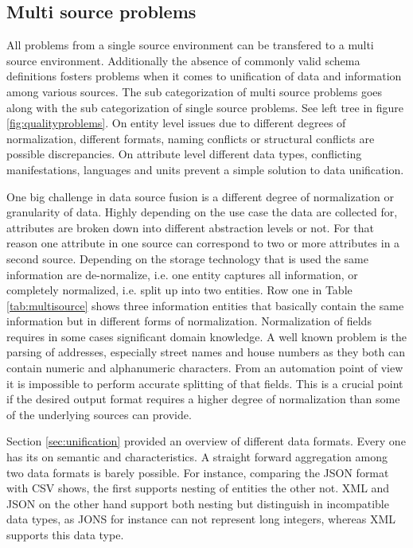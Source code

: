 \subsection{Multi source problems}
All problems from a single source environment can be transfered to a multi source environment. Additionally the absence of commonly valid schema definitions fosters problems when it comes to unification of data and information among various sources. The sub categorization of multi source problems goes along with the sub categorization of single source problems. See left tree in figure \ref{fig:qualityproblems}. On entity level issues due to different degrees of normalization, different formats, naming conflicts or structural conflicts are possible discrepancies. On attribute level different data types, conflicting manifestations, languages and units prevent a simple solution to data unification.

One big challenge in data source fusion is a different degree of normalization or granularity of data. Highly depending on the use case the data are collected for, attributes are broken down into different abstraction levels or not. For that reason one attribute in one source can correspond to two or more attributes in a second source. Depending on the storage technology that is used the same information are de-normalize, i.e. one entity captures all information, or completely normalized, i.e. split up into two entities. Row one in Table \ref{tab:multisource} shows three information entities that basically contain the same information but in different forms of normalization. Normalization of fields requires in some cases significant domain knowledge. A well known problem is the parsing of addresses, especially street names and house numbers as they both can contain numeric and alphanumeric characters. From an automation point of view it is impossible to perform accurate splitting of that fields. This is a crucial point if the desired output format requires a higher degree of normalization than some of the underlying sources can provide. 

Section \ref{sec:unification} provided an overview of different data formats. Every one has its on semantic and characteristics. A straight forward aggregation among two data formats is barely possible. For instance, comparing the JSON\cite{json_2017} format with CSV shows, the first supports nesting of entities the other not. XML and JSON on the other hand support both nesting\cite{xml_2017} but distinguish in incompatible data types, as JONS for instance can not represent long integers, whereas XML supports this data type.

